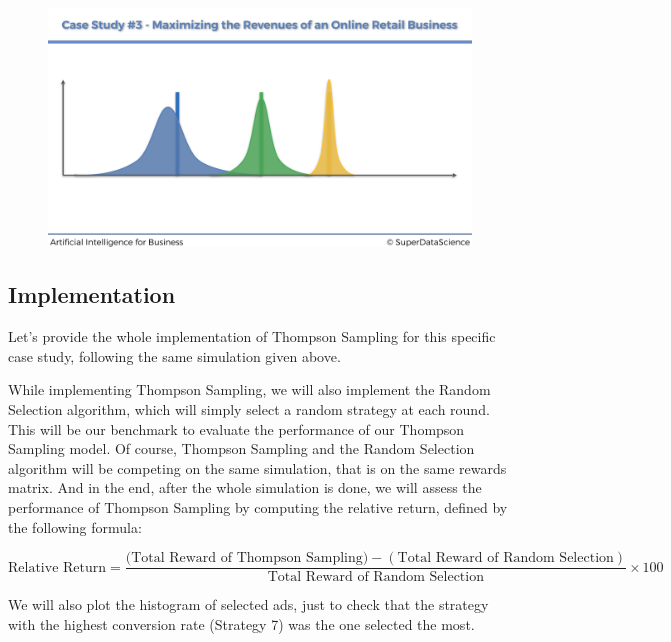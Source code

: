 \documentclass[]{book}
\begin{document}
\begin{figure}[!htbp]
        \begin{center}
            \includegraphics[scale=0.1]{Beta_Distribution_Slide.png}
        \end{center}
\end{figure}

\newpage

\subsection{Implementation}

Let's provide the whole implementation of Thompson Sampling for this specific case study, following the same simulation given above.

While implementing Thompson Sampling, we will also implement the Random Selection algorithm, which will simply select a random strategy at each round. This will be our benchmark to evaluate the performance of our Thompson Sampling model. Of course, Thompson Sampling and the Random Selection algorithm will be competing on the same simulation, that is on the same rewards matrix. And in the end, after the whole simulation is done, we will assess the performance of Thompson Sampling by computing the relative return, defined by the following formula:

\begin{equation*}
    \textrm{Relative Return} = \frac{\textrm{(Total Reward of Thompson Sampling)} - (\textrm{Total Reward of Random Selection})}{\textrm{Total Reward of Random Selection}} \times 100
\end{equation*}

We will also plot the histogram of selected ads, just to check that the strategy with the highest conversion rate (Strategy 7) was the one selected the most.
\end{document}
